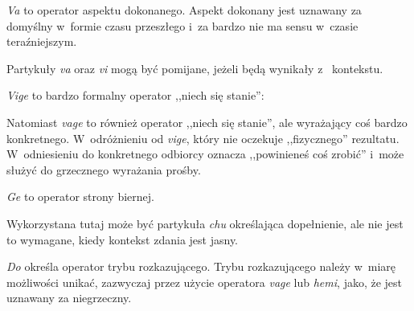 \begin{spacing}{1.1}


\emph{Va} to operator aspektu dokonanego. Aspekt dokonany jest uznawany za 
domyślny w~formie czasu przeszłego i~za bardzo nie ma sensu w~czasie 
teraźniejszym.




Partykuły \emph{va} oraz \emph{vi} mogą być pomijane, jeżeli będą wynikały z~
kontekstu.

\emph{Vige} to bardzo formalny operator ,,niech się stanie'':


Natomiast \emph{vage} to również operator ,,niech się stanie'', ale wyrażający coś
bardzo konkretnego. W~odróżnieniu od \emph{vige}, który nie oczekuje 
,,fizycznego'' rezultatu. W~odniesieniu do konkretnego odbiorcy oznacza 
,,powinieneś coś zrobić'' i~może służyć do grzecznego wyrażania prośby.




\emph{Ge} to operator strony biernej.


Wykorzystana tutaj może być partykuła \emph{chu} określająca dopełnienie, ale 
nie jest to wymagane, kiedy kontekst zdania jest jasny.


\skipline

\emph{Do} określa operator trybu rozkazującego. Trybu rozkazującego należy 
w~miarę możliwości unikać, zazwyczaj przez użycie operatora \emph{vage} lub 
\emph{hemi}, jako, że jest uznawany za niegrzeczny.


\end{spacing}
